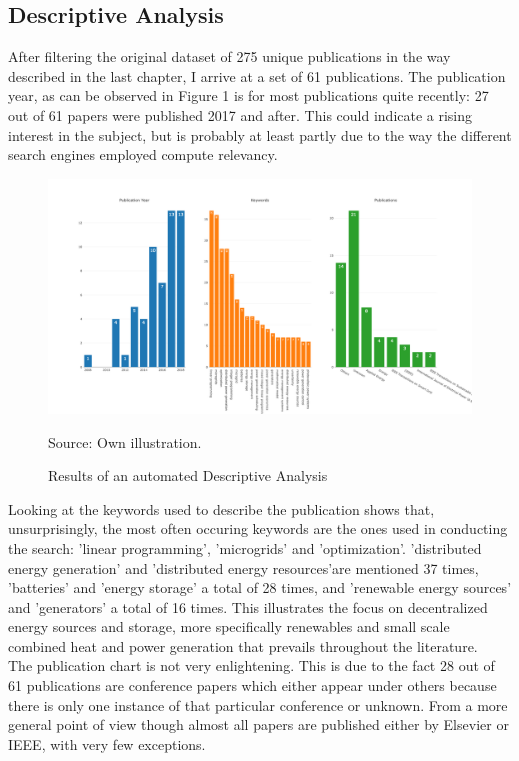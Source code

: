 \documentclass[
	11pt,								%
	DIV10,								%
	a4paper,         					%
	oneside,							%
	headheight=20pt,					%
	footheight=20pt,					%
    parskip=full,						%
    listof=totoc,						%
	bibliography=totoc,					%
	index=totoc,						%
]{scrartcl}
\begin{document}
\subsection{Descriptive Analysis}
After filtering the original dataset of 275 unique publications in the way described in the last chapter, I arrive at a set of 61 publications. The publication year, as can be observed in Figure 1 is for most publications quite recently: 27 out of 61 papers were published 2017 and after. This could indicate a rising interest in the subject, but is probably at least partly due to the way the different search engines employed compute relevancy.  
\begin{figure}[H]
	\centering
	\includegraphics[width=\textwidth]{pictures/Figure_1.png}
	\caption{Results of an automated Descriptive Analysis}
	\label{descriptive_anaylsis_results}
	\flushleft\quad\quad\footnotesize{Source: Own illustration.}
\end{figure}	
Looking at the keywords used to describe the publication shows that, unsurprisingly, the most often occuring keywords are the ones used in conducting the search: 'linear programming', 'microgrids' and 'optimization'. 'distributed energy generation' and 'distributed energy resources'are mentioned 37 times, 'batteries' and 'energy storage' a total of 28 times, and 'renewable energy sources' and 'generators' a total of 16 times. This illustrates the focus on decentralized energy sources and storage, more specifically renewables and small scale combined heat and power generation that prevails throughout the literature.
\\
The publication chart is not very enlightening. This is due to the fact 28 out of 61 publications are conference papers which either appear under others because there is only one instance of that particular conference or unknown. From a more general point of view though almost all papers are published either by Elsevier or IEEE, with very few exceptions.
\end{document}
